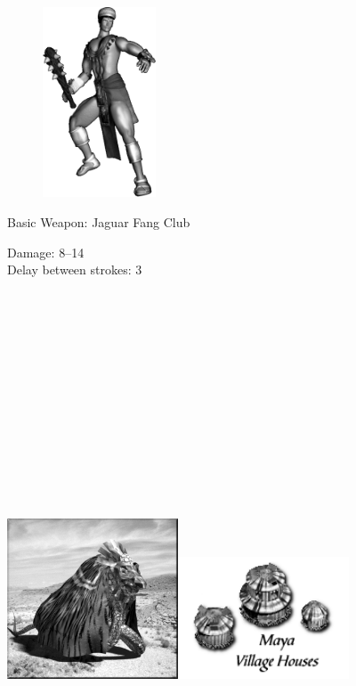 \begin{figure}
	\begin{center}
		\vspace{-20pt}
		\includegraphics[width=0.3\textwidth]{Amaya}
	\end{center}
	\vspace{-20pt}
\end{figure}

Basic Weapon: Jaguar Fang Club
\begin{changemargin}{.5cm}{0cm}
	Damage: 8–14 \\
	Delay between strokes: 3 \\ \\ \\ \\ \\ \\ \\ \\ \\ \\ \\ \\ \\ \\
\end{changemargin}

\begin{center}
	\includegraphics[width=2in]{Akukulcan}\hspace{1pt}\includegraphics[width=2in]{Imayanhouse}
\end{center}

